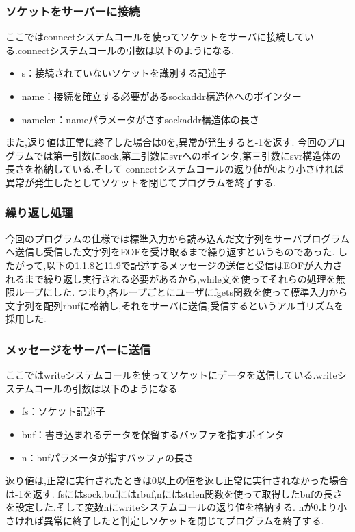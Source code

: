 \documentclass[dvipdfmx]{jarticle}
\begin{document}
\subsubsection{ソケットをサーバーに接続}
ここではconnectシステムコールを使ってソケットをサーバに接続している.connectシステムコールの引数は以下のようになる.\cite{10}
\begin{itemize}
    \item s：接続されていないソケットを識別する記述子
    \item name：接続を確立する必要があるsockaddr構造体へのポインター
    \item namelen：nameパラメータがさすsockaddr構造体の長さ
\end{itemize}
また,返り値は正常に終了した場合は0を,異常が発生すると-1を返す.
今回のプログラムでは第一引数にsock,第二引数にsvrへのポインタ,第三引数にsvr構造体の長さを格納している.そして
connectシステムコールの返り値が0より小さければ異常が発生したとしてソケットを閉じてプログラムを終了する.
\subsubsection{繰り返し処理}
今回のプログラムの仕様では標準入力から読み込んだ文字列をサーバプログラムへ送信し受信した文字列をEOFを受け取るまで繰り返すというものであった.
したがって,以下の1.1.8と11.9で記述するメッセージの送信と受信はEOFが入力されるまで繰り返し実行される必要があるから,while文を使ってそれらの処理を無限ループにした.
つまり,各ループごとにユーザにfgets関数を使って標準入力から文字列を配列rbufに格納し,それをサーバに送信,受信するというアルゴリズムを採用した.
\subsubsection{メッセージをサーバーに送信}
ここではwriteシステムコールを使ってソケットにデータを送信している.writeシステムコールの引数は以下のようになる.\cite{12}
\begin{itemize}
    \item fs：ソケット記述子
    \item buf：書き込まれるデータを保留するバッファを指すポインタ
    \item n：bufパラメータが指すバッファの長さ
\end{itemize}
返り値は,正常に実行されたときは0以上の値を返し正常に実行されなかった場合は-1を返す.
fsにはsock,bufにはrbuf,nにはstrlen関数を使って取得したbufの長さを設定した.そして変数nにwriteシステムコールの返り値を格納する.
nが0より小さければ異常に終了したと判定しソケットを閉じてプログラムを終了する.
\end{document}
